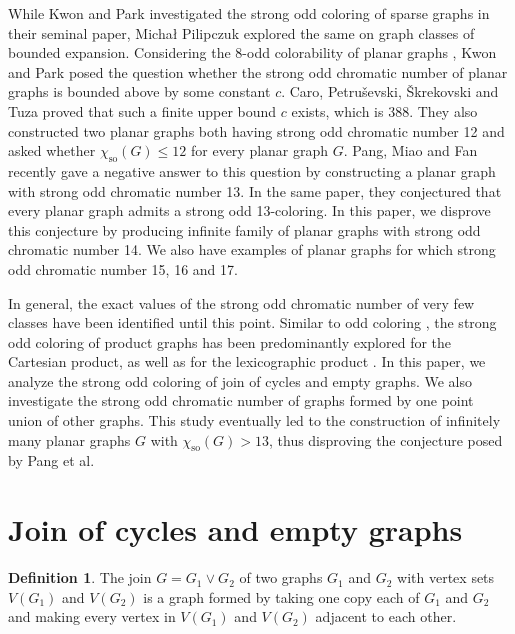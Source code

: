 \documentclass[12pt,a4paper]{article}
\theoremstyle{definition}
\newtheorem*{defn*}{Definition}
\numberwithin{equation}{section}
\begin{document}
While Kwon and Park \cite{Kwon} investigated the strong odd coloring of sparse graphs in their seminal paper, Michał Pilipczuk \cite{Michal} explored the same on graph classes of bounded expansion. Considering the $8$-odd colorability of planar graphs \cite{Petr}, Kwon and Park \cite{Kwon} posed the question whether the strong odd chromatic number of planar graphs is bounded above by some constant $c$. Caro, Petruševski, Škrekovski and Tuza \cite{Caro} proved that such a finite upper bound $c$ exists, which is 388. They also constructed two planar graphs both having strong odd chromatic number 12 and asked whether $\chi_{\text{so}}(G) \leq 12$ for every planar graph $G$. Pang, Miao and Fan \cite{Pang} recently gave a negative answer to this question by constructing a planar graph with strong odd chromatic number 13. In the same paper, they conjectured \cite{Pang} that every planar graph admits a strong odd 13-coloring. In this paper, we disprove this conjecture by producing infinite family of planar graphs with strong odd chromatic number 14. We also have examples of planar graphs for which strong odd chromatic number 15, 16 and 17.\par
  
In general, the exact values of the strong odd chromatic number of very few classes have been identified until this point. Similar to odd coloring \cite{Priya, Vida}, the strong odd coloring of product graphs has been predominantly explored for the Cartesian product, as well as for the lexicographic product \cite{Caro}. In this paper, we analyze the strong odd coloring of join of cycles and empty graphs. We also investigate the strong odd chromatic number of graphs formed by one point union of other graphs. This study eventually led to the construction of infinitely many planar graphs $G$ with $\chi_{\text{so}}(G) > 13$, thus disproving the conjecture \cite{Pang} posed by Pang et al. 
\section{Join of cycles and empty graphs}
\begin{defn*}
 The join $G = G_1 \vee G_2$ of two graphs $G_1$ and $G_2$ with vertex sets $V(G_1)$ and $V(G_2)$ is a graph formed by taking one copy each of $G_1$ and $G_2$ and making every vertex in $V(G_1)$ and $V(G_2)$ adjacent to each other.   
\end{defn*}
\end{document}

